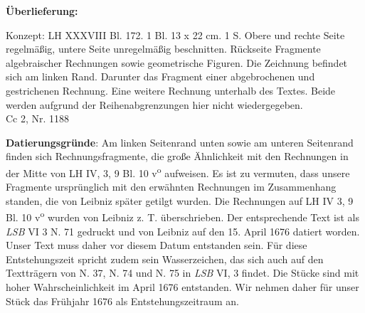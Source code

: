       
               
                \begin{ledgroupsized}[r]{120mm}
                \footnotesize 
                \pstart                
                \noindent\textbf{\"{U}berlieferung:}   
                \pend
                \end{ledgroupsized}
            
              
                            \begin{ledgroupsized}[r]{114mm}
                            \footnotesize 
                            \pstart \parindent -6mm
                            Konzept: LH XXXVIII Bl. 172. 1 Bl. 13 x 22 cm. 1 S. Obere und rechte Seite regelm\"{a}ßig, untere Seite unregelm\"{a}ßig beschnitten. R\"{u}ckseite Fragmente algebraischer Rechnungen sowie geometrische Figuren. Die Zeichnung befindet sich am linken Rand. Darunter das Fragment einer abgebrochenen und gestrichenen Rechnung. Eine weitere Rechnung unterhalb des Textes. Beide werden aufgrund der Reihenabgrenzungen hier nicht wiedergegeben.\\Cc 2, Nr. 1188 \pend
                            \end{ledgroupsized}
                \vspace*{5mm}
                \begin{ledgroup}
                \footnotesize 
                \pstart
            \noindent\footnotesize{\textbf{Datierungsgr\"{u}nde}: Am linken Seitenrand unten sowie am unteren Seitenrand finden sich Rechnungsfragmente, die große \"{A}hnlichkeit mit den Rechnungen in der Mitte von LH IV, 3, 9 Bl. 10 v\textsuperscript{o} aufweisen. Es ist zu vermuten, dass unsere Fragmente urspr\"{u}nglich mit den erw\"{a}hnten Rechnungen im Zusammenhang standen, die von Leibniz sp\"{a}ter getilgt wurden. Die Rechnungen auf LH IV 3, 9 Bl. 10 v\textsuperscript{o} wurden von Leibniz z. T. \"{u}berschrieben. Der entsprechende Text ist als \textit{LSB} VI 3 N. 71 gedruckt und von Leibniz auf den 15. April 1676 datiert worden. Unser Text muss daher vor diesem Datum entstanden sein. F\"{u}r diese Entstehungszeit spricht zudem sein Wasserzeichen, das sich auch auf den Texttr\"{a}gern von N. 37, N. 74 und N. 75 in \textit{LSB} VI, 3 findet. Die St\"{u}cke sind mit hoher Wahrscheinlichkeit im April 1676 entstanden. Wir nehmen daher f\"{u}r unser St\"{u}ck das Fr\"{u}hjahr 1676 als Entstehungszeitraum an.}
                \pend
                \end{ledgroup}
            
